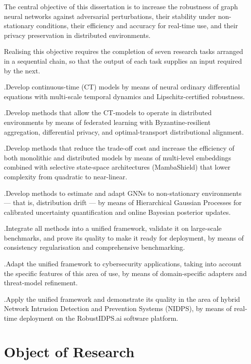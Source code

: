 The central objective of this dissertation is to increase the robustness of graph neural networks against adversarial perturbations, their stability under non-stationary conditions, their efficiency and accuracy for real-time use, and their privacy preservation in distributed environments.

Realising this objective requires the completion of seven research tasks arranged in a sequential chain, so that the output of each task supplies an input required by the next.

.\quad Develop continuous-time (CT) models by means of neural ordinary differential equations with multi-scale temporal dynamics and Lipschitz-certified robustness.

.\quad Develop methods that allow the CT-models to operate in distributed environments by means of federated learning with Byzantine-resilient aggregation, differential privacy, and optimal-transport distributional alignment.

.\quad Develop methods that reduce the trade-off cost and increase the efficiency of both monolithic and distributed models by means of multi-level embeddings combined with selective state-space architectures (MambaShield) that lower complexity from quadratic to near-linear.

.\quad Develop methods to estimate and adapt GNNs to non-stationary environments --- that is, distribution drift --- by means of Hierarchical Gaussian Processes for calibrated uncertainty quantification and online Bayesian posterior updates.

.\quad Integrate all methods into a unified framework, validate it on large-scale benchmarks, and prove its quality to make it ready for deployment, by means of consistency regularisation and comprehensive benchmarking.

.\quad Adapt the unified framework to cybersecurity applications, taking into account the specific features of this area of use, by means of domain-specific adapters and threat-model refinement.

.\quad Apply the unified framework and demonstrate its quality in the area of hybrid Network Intrusion Detection and Prevention Systems (NIDPS), by means of real-time deployment on the RobustIDPS.ai software platform.


\section*{Object of Research}

